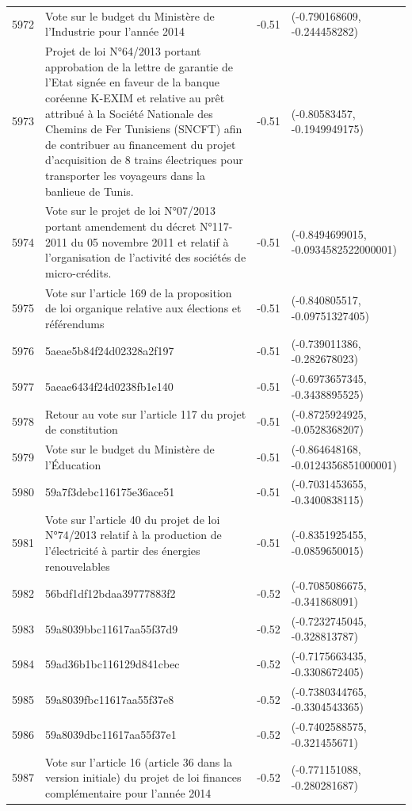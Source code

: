 \begin{table}[ht]
\begin{tabular}{rlrl}
  5972 & Vote sur le budget du Ministère de l'Industrie pour l'année 2014 & -0.51 & (-0.790168609, -0.244458282) \\ 
  5973 & Projet de loi N°64/2013 portant approbation de la lettre de garantie de l'Etat signée en faveur de la banque coréenne K-EXIM et relative au prêt attribué à la Société Nationale des Chemins de Fer Tunisiens (SNCFT) afin de contribuer au financement du projet d’acquisition de 8 trains électriques pour transporter les voyageurs dans la banlieue de Tunis. & -0.51 & (-0.80583457, -0.1949949175) \\ 
  5974 & Vote sur le projet de loi N°07/2013 portant amendement du décret N°117-2011 du 05 novembre 2011 et relatif à l’organisation de l’activité des sociétés de micro-crédits. & -0.51 & (-0.8494699015, -0.0934582522000001) \\ 
  5975 & Vote sur l'article 169 de la proposition de loi organique relative aux élections et référendums & -0.51 & (-0.840805517, -0.09751327405) \\ 
  5976 & 5aeae5b84f24d02328a2f197 & -0.51 & (-0.739011386, -0.282678023) \\ 
  5977 & 5aeae6434f24d0238fb1e140 & -0.51 & (-0.6973657345, -0.3438895525) \\ 
  5978 & Retour au vote sur l'article 117 du projet de constitution & -0.51 & (-0.8725924925, -0.0528368207) \\ 
  5979 & Vote sur le budget du Ministère de l'Éducation & -0.51 & (-0.864648168, -0.0124356851000001) \\ 
  5980 & 59a7f3debc116175e36ace51 & -0.51 & (-0.7031453655, -0.3400838115) \\ 
  5981 & Vote sur l'article 40 du projet de loi N°74/2013 relatif à la production de l'électricité à partir des énergies renouvelables & -0.51 & (-0.8351925455, -0.0859650015) \\ 
  5982 & 56bdf1df12bdaa39777883f2 & -0.52 & (-0.7085086675, -0.341868091) \\ 
  5983 & 59a8039bbc11617aa55f37d9 & -0.52 & (-0.7232745045, -0.328813787) \\ 
  5984 & 59ad36b1bc116129d841cbec & -0.52 & (-0.7175663435, -0.3308672405) \\ 
  5985 & 59a8039fbc11617aa55f37e8 & -0.52 & (-0.7380344765, -0.3304543365) \\ 
  5986 & 59a8039dbc11617aa55f37e1 & -0.52 & (-0.7402588575, -0.321455671) \\ 
  5987 & Vote sur l'article 16 (article 36 dans la version initiale) du projet de loi finances complémentaire pour l'année 2014 & -0.52 & (-0.771151088, -0.280281687) \\ 

\end{tabular}
\end{table}
